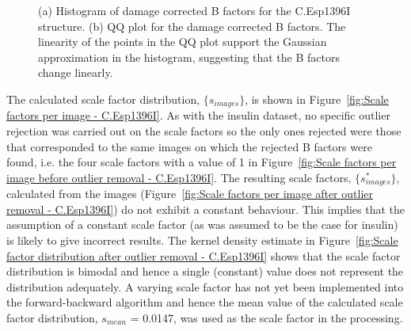 \begin{figure}
\begin{subfigure}[b]{1.0\textwidth}
            \caption{}
            \label{fig:B factor QQ plot - C.Esp1396I}
    \end{subfigure}
    \caption[Normality of calculated B factor distribution for the C.Esp1396I dataset.]{(a) Histogram of damage corrected B factors for the C.Esp1396I structure.
    (b) QQ plot for the damage corrected B factors.
    The linearity of the points in the QQ plot support the Gaussian approximation in the histogram, suggesting that the B factors change linearly.}
    \label{fig:Gaussian B factor plots - C.Esp1396I}
\end{figure}

The calculated scale factor distribution, $\{ s_{images} \}$, is shown in Figure~\ref{fig:Scale factors per image - C.Esp1396I}.
As with the insulin dataset, no specific outlier rejection was carried out on the scale factors so the only ones rejected were those that corresponded to the same images on which the rejected B factors were found, i.e. the four scale factors with a value of 1 in Figure~\ref{fig:Scale factors per image before outlier removal - C.Esp1396I}.
The resulting scale factors, $\{ s^{*}_{images} \}$, calculated from the images (Figure~\ref{fig:Scale factors per image after outlier removal - C.Esp1396I}) do not exhibit a constant behaviour.
This implies that the assumption of a constant scale factor (as was assumed to be the case for insulin) is likely to give incorrect results.
The kernel density estimate in Figure~\ref{fig:Scale factor distribution after outlier removal - C.Esp1396I} shows that the scale factor distribution is bimodal and hence a single (constant) value does not represent the distribution adequately.
A varying scale factor has not yet been implemented into the forward-backward algorithm and hence the mean value of the calculated scale factor distribution, $s_{mean}$ = 0.0147, was used as the scale factor in the processing.
